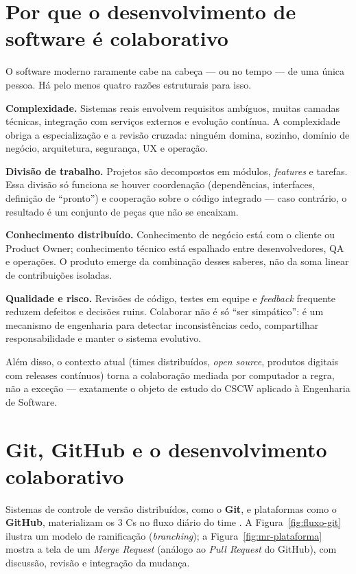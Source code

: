 \documentclass[
    12pt,
    oneside,
    a4paper,
    article,
    section=TITLE,
    sumario=abnt-6027-2012
]{abntex2}
\begin{document}
\section{Por que o desenvolvimento de software é colaborativo}
\label{sec:porque}

O software moderno raramente cabe na cabeça --- ou no tempo --- de uma única pessoa. Há pelo menos quatro razões estruturais para isso.

\textbf{Complexidade.} Sistemas reais envolvem requisitos ambíguos, muitas camadas técnicas, integração com serviços externos e evolução contínua. A complexidade obriga a especialização e a revisão cruzada: ninguém domina, sozinho, domínio de negócio, arquitetura, segurança, UX e operação.

\textbf{Divisão de trabalho.} Projetos são decompostos em módulos, \textit{features} e tarefas. Essa divisão só funciona se houver coordenação (dependências, interfaces, definição de ``pronto'') e cooperação sobre o código integrado --- caso contrário, o resultado é um conjunto de peças que não se encaixam.

\textbf{Conhecimento distribuído.} Conhecimento de negócio está com o cliente ou Product Owner; conhecimento técnico está espalhado entre desenvolvedores, QA e operações. O produto emerge da combinação desses saberes, não da soma linear de contribuições isoladas.

\textbf{Qualidade e risco.} Revisões de código, testes em equipe e \textit{feedback} frequente reduzem defeitos e decisões ruins. Colaborar não é só ``ser simpático'': é um mecanismo de engenharia para detectar inconsistências cedo, compartilhar responsabilidade e manter o sistema evolutivo.

Além disso, o contexto atual (times distribuídos, \textit{open source}, produtos digitais com releases contínuos) torna a colaboração mediada por computador a regra, não a exceção --- exatamente o objeto de estudo do CSCW aplicado à Engenharia de Software.

\section{Git, GitHub e o desenvolvimento colaborativo}
\label{sec:git}

Sistemas de controle de versão distribuídos, como o \textbf{Git}, e plataformas como o \textbf{GitHub}, materializam os 3 Cs no fluxo diário do time \cite{chacon2014}. A Figura~\ref{fig:fluxo-git} ilustra um modelo de ramificação (\textit{branching}); a Figura~\ref{fig:mr-plataforma} mostra a tela de um \textit{Merge Request} (análogo ao \textit{Pull Request} do GitHub), com discussão, revisão e integração da mudança.
\end{document}

